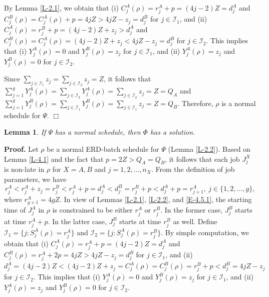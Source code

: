 \documentclass[12pt]{article}
\newtheorem{lemma}{Lemma}[section]
\begin{document}
\begin{sloppypar}
By Lemma \ref{L-2.1}, we obtain that (i) $C_j^A(\rho)=r_j^A+p=(4j-2)Z=d_j^A$ and $C_j^B(\rho)=C_j^A(\rho)+p=4jZ>4jZ-z_j=d_j^B$ for $j \in \mathcal{I}_1$, and (ii) $C_j^A(\rho)=r_j^B+p=(4j-2)Z+z_j>d_j^A$ and $C_j^B(\rho)=C_j^A(\rho)=(4j-2)Z+z_j<4jZ-z_j=d_j^B$ for $j \in \mathcal{I}_2$. This implies that (i) $Y_j^A(\rho)=0$ and $Y_j^B(\rho)=z_j$ for $j \in \mathcal{I}_1$,
and (ii) $Y_j^A(\rho)=z_j$ and $Y_j^B(\rho)=0$ for $j \in \mathcal{I}_2$.

Since $\sum_{j \in \mathcal{I}_1} z_j= \sum_{j \in \mathcal{I}_2} z_j=Z$, it follows that 
$\sum_{j=1}^g Y_j^A(\rho)=\sum_{j \in \mathcal{I}_2} Y_j^A(\rho) =\sum_{j \in \mathcal{I}_2} z_j=Z=Q_A$
and $\sum_{j=1}^g Y_j^B(\rho)=\sum_{j \in \mathcal{I}_1} Y_j^B(\rho)=\sum_{j \in \mathcal{I}_1} z_j=Z=Q_B$.
Therefore, $\rho$ is a normal schedule for $\Psi$. \hfill$\Box$

\begin{lemma} \label{L-4.5.2}
If $\Psi$ has a normal schedule, then $\Phi$ has a solution.
\end{lemma}
\noindent \textbf{Proof.} Let $\rho$ be a normal ERD-batch schedule for $\Psi$ (Lemma \ref{L-2.2}).
Based on Lemma \ref{L-4.1} and the fact that $p=2Z>Q_A=Q_B$, it follows that each job $J_j^X$ is non-late in $\rho$ for $X=A, B$ and $j=1, 2, \ldots, n_X$. From the definition of job parameters, we have
\begin{equation}\label{E-4.5.1}
r_j^A <r_j^A+z_j=r_j^B<r_j^A+p=d_j^A<d_j^B=r_j^B+p<d_j^A+p= r_{j+1}^A, ~ j \in \{1, 2, \ldots, g\},
\end{equation}
where $r_{g+1}^A=4gZ$. In view of Lemmas \ref{L-2.1}, \ref{L-2.2}, and \eqref{E-4.5.1}, the starting time of $J_j^A$ in $\rho$ is constrained to be either $r_j^A$ or $r_j^B$. In the former case, $J_j^B$ starts at time $r_j^A+p$. In the latter case, $J_j^B$ starts at time $r_j^B$ as well. Define $\mathcal{I}_1=\{j: S_j^A(\rho)=r_j^A\}$
and $\mathcal{I}_2=\{j: S_j^A(\rho)=r_j^B\}$. By simple computation, we obtain that (i)
$C_j^A(\rho)=r_j^A+p=(4j-2) Z =d_j^A$ and $C_j^B(\rho)=r_j^A+2p=4jZ>4jZ-z_j=d_j^B$ for $j \in \mathcal{I}_1$, and (ii) $d_j^A=(4j-2)Z<(4j-2)Z+z_j=C_j^A(\rho)=C_j^B(\rho)=r_j^B+p<d_j^B=4jZ-z_j$ for $j \in \mathcal{I}_2$. This implies that (i) $Y_j^A(\rho)=0$ and $Y_j^B(\rho)=z_j$ for $j \in \mathcal{I}_1$, and (ii) $Y_j^A(\rho)=z_j$ and $Y_j^B(\rho)=0$ for $j \in \mathcal{I}_2$.


\end{sloppypar}
\end{document}
